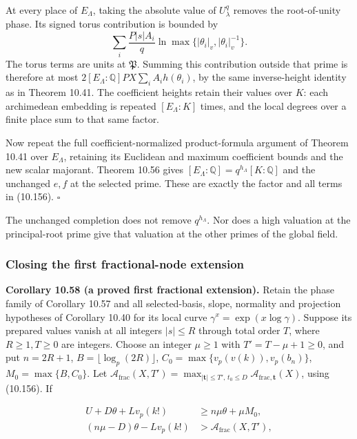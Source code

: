 \documentclass[
  11pt,
  a4paper,
]{article}
\begin{document}
At every place of \(E_\Lambda\), taking the absolute value of
\(U_\lambda^q\) removes the root-of-unity phase. Its signed torus
contribution is bounded by \[
\sum_i \frac{P|s|A_i}{q}
\ln\max\{|\theta_i|_v,|\theta_i|_v^{-1}\}.
\] The torus terms are units at \(\mathfrak P\). Summing this
contribution outside that prime is therefore at most
\(2[E_\Lambda:\mathbb Q]PX\sum_iA_i h(\theta_i)\), by the same
inverse-height identity as in Theorem 10.41. The coefficient heights
retain their values over \(K\): each archimedean embedding is repeated
\([E_\Lambda:K]\) times, and the local degrees over a finite place sum
to that same factor.

Now repeat the full coefficient-normalized product-formula argument of
Theorem 10.41 over \(E_\Lambda\), retaining its Euclidean and maximum
coefficient bounds and the new scalar majorant. Theorem 10.56 gives
\([E_\Lambda:\mathbb Q]=q^{h_\Lambda}[K:\mathbb Q]\) and the unchanged
\(e,f\) at the selected prime. These are exactly the factor and all
terms in (10.156). \(\square\)

The unchanged completion does not remove \(q^{h_\Lambda}\). Nor does a
high valuation at the principal-root prime give that valuation at the
other primes of the global field.

\subsubsection{Closing the first fractional-node
extension}\label{closing-the-first-fractional-node-extension}

\textbf{Corollary 10.58 (a proved first fractional extension).} Retain
the phase family of Corollary 10.57 and all selected-basis, slope,
normality and projection hypotheses of Corollary 10.40 for its local
curve \(\gamma^x=\exp(x\log\gamma)\). Suppose its prepared values vanish
at all integers \(|s|\le R\) through total order \(T\), where
\(R\ge1,T\ge0\) are integers. Choose an integer \(\mu\ge1\) with
\(T'=T-\mu+1\ge0\), and put \(n=2R+1\), \(B=\lfloor\log_p(2R)\rfloor\),
\(C_0=\max\{v_p(v(k)),v_p(b_n)\}\), \(M_0=\max\{B,C_0\}\). Let
\(\mathcal A_{\mathrm{frac}}(X,T')=
\max_{|\boldsymbol t|\le T',\,t_0\le D}
\mathcal A_{\mathrm{frac},\boldsymbol t}(X)\), using (10.156). If

\[
\begin{aligned}
U+D\theta+Lv_p(k!)&\ge n\mu\theta+\mu M_0,\\
(n\mu-D)\theta-Lv_p(k!)&>
\mathcal A_{\mathrm{frac}}(X,T'),
\end{aligned}
\tag{10.157}
\]
\end{document}
